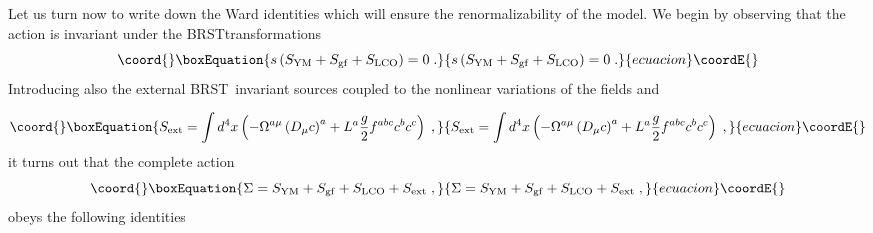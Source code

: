 \documentclass[a4paper,12pt]{article}
\begin{document}
Let us turn now to write down the Ward identities which will ensure the
renormalizability of the model. We begin by observing that the action \coordHE{} is
invariant under the BRST\myHighlight{$\;$}\coordHE{}transformations\ \myHighlight{$\left( \ref{brst}\right)
,\left( \ref{jld}\right) $}\coordHE{}%
\begin{equation}\coord{}\boxEquation{
s\left( S_{\mathrm{YM}}+S_{\mathrm{gf}}+S_{\mathrm{LCO}}\right) =0\;.
\label{a}
}{
s\left( S_{\mathrm{YM}}+S_{\mathrm{gf}}+S_{\mathrm{LCO}}\right) =0\;.
}{ecuacion}\coordE{}\end{equation}
Introducing also the external BRST\ invariant sources \coordHE{} coupled to the nonlinear variations of the fields \coordHE{}and \coordHE{} \cite{book}

\begin{equation}\coord{}\boxEquation{
S_{\mathrm{ext}}=\int d^{4}x\left( -\Omega ^{a\mu }\left( D_{\mu }c\right)
^{a}+L^{a}\frac{g}{2}f^{abc}c^{b}c^{c}\right) \;,  \label{sext}
}{
S_{\mathrm{ext}}=\int d^{4}x\left( -\Omega ^{a\mu }\left( D_{\mu }c\right)
^{a}+L^{a}\frac{g}{2}f^{abc}c^{b}c^{c}\right) \;,  }{ecuacion}\coordE{}\end{equation}
it turns out that the complete action 
\begin{equation}\coord{}\boxEquation{
\Sigma =S_{\mathrm{YM}}+S_{\mathrm{gf}}+S_{\mathrm{LCO}}+S_{\mathrm{ext}}\;,
\label{ca}
}{
\Sigma =S_{\mathrm{YM}}+S_{\mathrm{gf}}+S_{\mathrm{LCO}}+S_{\mathrm{ext}}\;,
}{ecuacion}\coordE{}\end{equation}
obeys the following identities \cite{book}
\end{document}
